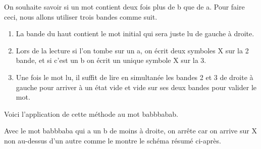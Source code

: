 On souhaite savoir si un mot contient deux fois plus de b que de a. Pour faire ceci, nous allons utiliser trois bandes comme suit.
\begin{enumerate}
	\item La bande du haut contient le mot initial qui sera juste lu de gauche à droite.

	\item Lors de la lecture si l'on tombe sur un a, on écrit deux symboles X sur la 2\ieme{} bande, et si c'est un b on écrit un unique symbole X sur la 3\ieme{}.

	\item Une fois le mot lu, il suffit de lire en simultanée les bandes 2 et 3 de droite à gauche pour arriver à un état vide et vide sur ses deux bandes pour valider le mot.
\end{enumerate}

Voici l'application de cette méthode au mot babbbabab.


\medskip %




\bigskip

Avec le mot babbbaba qui a un b de moins à droite, on arrête car on arrive sur X non au-dessus d'un autre comme le montre le schéma résumé ci-après.



